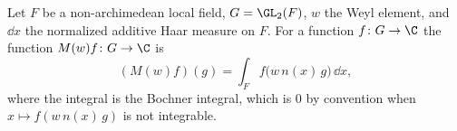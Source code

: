 Let $F$ be a non-archimedean local field, $G=\GL_2(F)$, $w$ the Weyl element, and $\dd x$ the normalized additive Haar
measure on $F$. For a function $f\colon G\to\C$ the function $M(w)f\colon G\to\C$ is
\[
  (M(w)f)(g)=\int_Ff\bigl(w\,n(x)\,g\bigr)\,\dd x ,
\]
where the integral is the Bochner integral, which is $0$ by convention when $x\mapsto f(w\,n(x)\,g)$ is not integrable.
